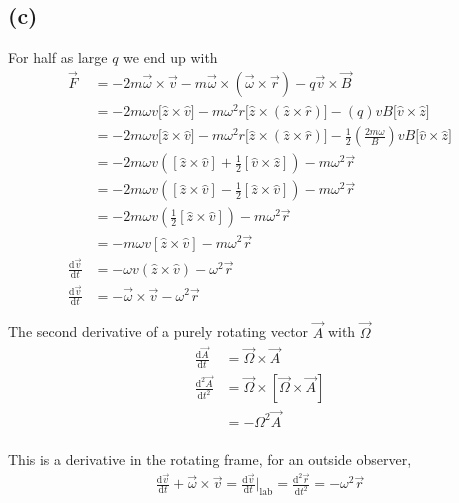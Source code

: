 \documentclass[letter, 10pts]{article}
\begin{document}
\newpage
\subsection*{(c)}
For half as large $q$ we end up with 
\begin{align*}
	\vec{F}  &=  - 2m  \vec{\omega} \times \vec{v} 
- m \vec{\omega} \times (\vec{\omega} \times \vec{r})
- q \vec{v} \times \vec{B} \\ 
	 &= - 2m \omega v 
\Biggr[ 
\hat{z} \times \hat{v}
\Biggr]
- m \omega^2 r \Biggr[ \hat{z} \times (\hat{z} \times \hat{r} ) \Biggr]- 
\left(
q
\right)v B \Biggr[\hat{v} \times \hat{z}\Biggr] \\
		&= - 2m \omega v 
\Biggr[ 
\hat{z} \times \hat{v}
\Biggr]
- m \omega^2 r \Biggr[ \hat{z} \times (\hat{z} \times \hat{r} ) \Biggr]- 
\frac{1}{2}
\left(
\frac{2 m \omega}{B}
\right)v B \Biggr[\hat{v} \times \hat{z}\Biggr] \\
&= 
- 2m \omega v 
\left(
	[\hat{z} \times \hat{v} ] + \frac{1}{2} [\hat{v} \times \hat{z}] 
\right)- m \omega^2 \vec{r}
\\
&= 
- 2m \omega v 
\left(
	[\hat{z} \times \hat{v} ] - \frac{1}{2} [\hat{z} \times \hat{v}] 
\right)- m \omega^2 \vec{r}
\\
&= 
- 2m \omega v 
\left(
	 \frac{1}{2} [\hat{z} \times \hat{v}] 
\right)- m \omega^2 \vec{r}
\\
&= 
- m \omega v 
	[\hat{z} \times \hat{v}] 
- m \omega^2 \vec{r}
\\
\frac{\mathrm{d} \vec{v}}{\mathrm{d} t} &= 
- \omega v \left( \hat{z} \times  \hat{v} \right) - \omega^2 \vec{r}
\tag{NOTE: rotating frame derivative}
\\
\frac{\mathrm{d} \vec{v}}{\mathrm{d} t} &= - \vec{\omega} \times  \vec{v} - \omega^2 \vec{r} \\
\\
\end{align*}
The second derivative of a purely rotating vector $\vec{A}$ with $\vec{\Omega}$
\begin{align*}
	\frac{\mathrm{d} \vec{A}}{\mathrm{d} t} &= \vec{\Omega} \times \vec{A}\\
	\frac{\mathrm{d}^2 \vec{A}}{\mathrm{d} t^2} &=
\vec{\Omega}\times 	\left[\vec{\Omega} \times \vec{A}\right]\\
&=  - 
\Omega^2 \vec{A} 
\\
\end{align*}


%
%
%
%
This is a derivative in the rotating frame, for an outside observer, 
\begin{align*}
\frac{\mathrm{d} \vec{v}}{\mathrm{d} t} + \vec{\omega} \times \vec{v} = \frac{\mathrm{d} \vec{v}}{\mathrm{d} t} \Biggr|_\text{lab} = \frac{\mathrm{d} ^2 \vec{r}}{\mathrm{d} t^2} = - \omega^2 \vec{r}
\end{align*}
\end{document}
